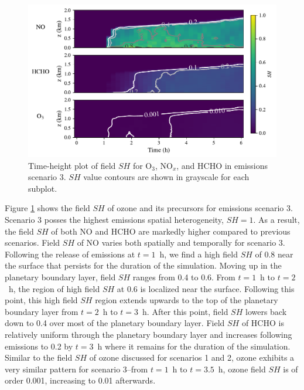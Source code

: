   \begin{figure}[!t]
    \centering
    \includegraphics[width=.97\textwidth]{figures/chapter4/height-time-nsh-multivar-point-source-1x1.pdf}
    \caption{Time-height plot of field $SH$ for O$_3$, NO$_x$, and HCHO in emissions scenario 3. $SH$ value contours are shown in grayscale for each subplot.}
    \label{fig:atmos-sh-s3}
 \end{figure}
 
Figure \ref{fig:atmos-sh-s3} shows the field $SH$ of ozone and its precursors for emissions scenario 3. Scenario 3 posses the highest emissions spatial heterogeneity, $SH=1$. As a result, the field $SH$ of both NO and HCHO are markedly higher compared to previous scenarios. Field $SH$ of NO varies both spatially and temporally for scenario 3. Following the release of emissions at $t=1$~h, we find a high field $SH$ of 0.8 near the surface that persists for the duration of the simulation. Moving up in the planetary boundary layer, field $SH$ ranges from 0.4 to 0.6. From $t=1$~h to $t=2$~h, the region of high field $SH$ at 0.6 is localized near the surface. Following this point, this high field $SH$ region extends upwards to the top of the planetary boundary layer from  $t=2$~h to $t=3$~h. After this point, field $SH$ lowers back down to 0.4 over most of the planetary boundary layer. Field $SH$ of HCHO is relatively uniform through the planetary boundary layer and increases following emissions to 0.2 by $t=3$~h where it remains for the duration of the simulation. Similar to the field $SH$ of ozone discussed for scenarios 1 and 2, ozone exhibits a very similar pattern for scenario 3--from $t=1$~h to $t=3.5$~h, ozone field $SH$ is of order 0.001, increasing to 0.01 afterwards.




